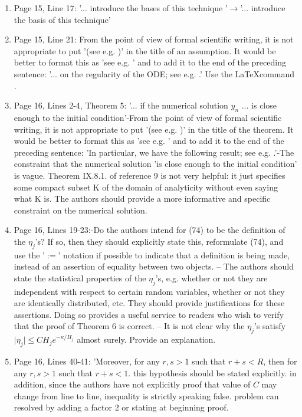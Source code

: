 \documentclass{article}
\begin{document}
\begin{enumerate}[label=(\arabic*)]
		\item Page 15, Line 17: '... introduce the bases of this technique '$\to$'... introduce the basis of this technique'
		\item Page 15, Line 21: From the point of view of formal scientific writing, it is not appropriate to put '(see e.g. \cite{...})' in the title of an assumption. It would be better to format this as 'see e.g. \cite{...}' and to add it to the end of the preceding sentence: '... on the regularity of the ODE; see e.g. \cite{...}.' Use the \LaTeX command \cite[Section IX.7]{book}.
		\item Page 16, Lines 2-4, Theorem 5: '... if the numerical solution $y_n$ ... is close enough to the initial condition'-From the point of view of formal scientific writing, it is not appropriate to put '(see e.g. \cite{...})' in the title of the theorem. It would be better to format this as 'see e.g. \cite{...}' and to add it to the end of the preceding sentence: 'In particular, we have the following result; see e.g. \cite[Theorem IX.8.1]{...}.'-The constraint that the numerical solution 'is close enough to the initial condition' is vague. Theorem IX.8.1. of reference 9 is not very helpful: it just specifies some compact subset K of the domain of analyticity without even saying what K is. The authors should provide a more informative and specific constraint on the numerical solution.
		\item Page 16, Lines 19-23:-Do the authors intend for (74) to be the definition of the $\eta_j$'s? If so, then they should explicitly state this, reformulate (74), and use the '$:=$' notation if possible to indicate that a definition is being made, instead of an assertion of equality between two objects. -- The authors should state the statistical properties of the $\eta_j$'s, e.g. whether or not they are independent with respect to certain random variables, whether or not they are identically distributed, etc. They should provide justifications for these assertions. Doing so provides a useful service to readers who wish to verify that the proof of Theorem 6 is correct. -- It is not clear why the $\eta_j$'s satisfy $\vert\eta_j\vert\leq CH_j e^{-\kappa/H_j}$ almost surely. Provide an explanation.
		\item Page 16, Lines 40-41: 'Moreover, for any $r,s>1$ such that $r+s<R$, then for any $r,s>1$ such that $r+s<1$. this hypothesis should be stated explicitly. in addition, since the authors have not explicitly proof that value of $C$ may change from line to line, inequality is strictly speaking false. problem can resolved by adding a factor 2 or stating at beginning proof.

\end{enumerate}
\end{document}
